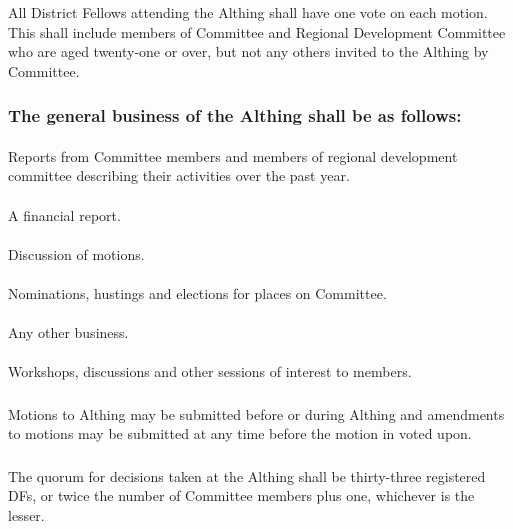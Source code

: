 \documentclass[a4paper, 12pt]{article}
\begin{document}
\subsubsection{}
All District Fellows attending the Althing shall have one vote on each motion.  This shall include members of Committee and Regional Development Committee who are aged twenty-one or over, but not any others invited to the Althing by Committee.
\subsubsection{The general business of the Althing shall be as follows:}
\paragraph{}
Reports from Committee members and members of regional development committee describing their activities over the past year.
\paragraph{}
A financial report.
\paragraph{}
Discussion of motions.
\paragraph{}
Nominations, hustings and elections for places on Committee.
\paragraph{}
Any other business.
\paragraph{}
Workshops, discussions and other sessions of interest to members.
\subsubsection{}
Motions to Althing may be submitted before or during Althing and amendments to motions may be submitted at any time before the motion in voted upon.
\subsubsection{}
The quorum for decisions taken at the Althing shall be thirty-three registered DFs, or twice the number of Committee members plus one, whichever is the lesser.
\end{document}

